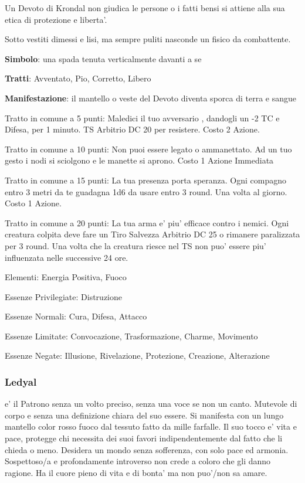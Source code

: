 \documentclass[a4paper,11pt,twoside,openany]{book}
\begin{document}
{		Un Devoto di Krondal non giudica le persone o i fatti bensi si attiene alla sua etica di protezione e liberta'.
		
		Sotto vestiti dimessi e lisi, ma sempre puliti nasconde un fisico da combattente.
		
		\textbf{Simbolo}: una spada tenuta verticalmente davanti a se
		
		\textbf{Tratti}: Avventato, Pio, Corretto, Libero
		
		\textbf{Manifestazione}: il mantello o veste del Devoto diventa sporca
		di terra e sangue
		
		\bigskip
		
		Tratto in comune a 5 punti: Maledici il tuo avversario , dandogli un -2 TC e Difesa, per 1 minuto. TS Arbitrio DC 20 per resistere. Costo 2 Azione.
		
		Tratto in comune a 10 punti: Non puoi essere legato o ammanettato. Ad un tuo gesto i nodi si sciolgono e le manette si aprono. Costo 1 Azione Immediata
		
		Tratto in comune a 15 punti: La tua presenza porta speranza. Ogni compagno entro 3 metri da te guadagna 1d6 da usare entro 3 round. Una volta al giorno. Costo 1 Azione.
		
		Tratto in comune a 20 punti: La tua arma e' piu' efficace contro i nemici. Ogni creatura colpita deve fare un Tiro Salvezza Arbitrio DC 25 o rimanere paralizzata per 3 round. Una volta che la creatura riesce nel TS non puo' essere piu' influenzata nelle successive 24 ore.
		
		\bigskip
		
		Elementi: Energia Positiva, Fuoco
		
		\bigskip
		
		Essenze Privilegiate: Distruzione
		
		Essenze Normali: Cura, Difesa, Attacco
		
		Essenze Limitate: Convocazione, Trasformazione, Charme, Movimento
		
		Essenze Negate: Illusione, Rivelazione, Protezione, Creazione, Alterazione
		
		\subsubsection{Ledyal}
		
		\label{ledyal}
		
		e' il Patrono senza un volto preciso, senza una voce se non un canto. Mutevole di corpo e senza una definizione chiara del suo essere. Si manifesta con un lungo mantello color rosso fuoco dal tessuto fatto da mille farfalle. Il suo tocco e' vita e pace, protegge chi necessita dei suoi favori indipendentemente dal fatto che li chieda o meno. Desidera un mondo senza sofferenza, con solo pace ed armonia. Sospettoso/a e profondamente introverso non crede a coloro che gli danno ragione. Ha il cuore pieno di vita e di bonta' ma non puo'/non sa amare.
		
}
\end{document}
